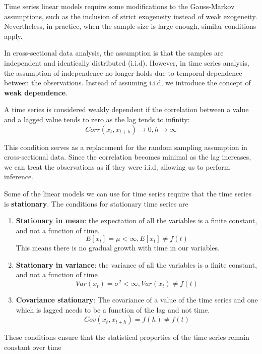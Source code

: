 Time series linear models require some modifications to the Gauss-Markov assumptions, such as the inclusion of strict exogeneity instead of weak exogeneity. Nevertheless, in practice, when the sample size is large enough, similar conditions apply.

In cross-sectional data analysis, the assumption is that the samples are independent and identically distributed (i.i.d). However, in time series analysis, the assumption of independence no longer holds due to temporal dependence between the observations. Instead of assuming i.i.d, we introduce the concept of \textbf{weak dependence}.

A time series is considered weakly dependent if the correlation between a value and a lagged value tends to zero as the lag tends to infinity:
\[Corr(x_t, x_{t+h}) \rightarrow 0, h \rightarrow \infty\]

This condition serves as a replacement for the random sampling assumption in cross-sectional data. Since the correlation becomes minimal as the lag increases, we can treat the observations as if they were i.i.d, allowing us to perform inference.

Some of the linear models we can use for time series require that the time series is \textbf{stationary}. The conditions for stationary time series are

\begin{enumerate}
    \item \textbf{Stationary in mean}: the expectation of all the variables is a finite constant, and not a function of time. \[E[x_t] = \mu < \infty, E[x_t] \neq f(t)\] This means there is no gradual growth with time in our variables.
    \item \textbf{Stationary in variance}: the variance of all the variables is a finite constant, and not a function of time\textit{ }\[Var(x_t) = \sigma^2 < \infty, Var(x_t) \neq f(t)\]
    \item \textbf{Covariance stationary}: The covariance of a value of the time series and one which is lagged needs to be a function of the lag and not time. \[Cov(x_t, x_{t+h}) = f(h) \neq f(t)\]
\end{enumerate}

These conditions ensure that the statistical properties of the time series remain constant over time


